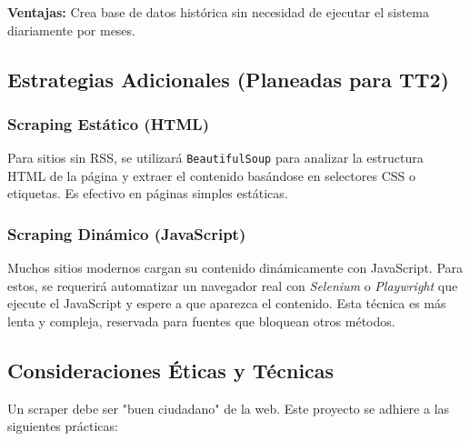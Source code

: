 \textbf{Ventajas:} Crea base de datos histórica sin necesidad de ejecutar el sistema diariamente por meses.

\subsection{Estrategias Adicionales (Planeadas para TT2)}
\label{subsec:estrategias_futuras}

\subsubsection{Scraping Estático (HTML)}
Para sitios sin RSS, se utilizará \texttt{BeautifulSoup} para analizar la estructura HTML de la página y extraer el contenido basándose en selectores CSS o etiquetas. Es efectivo en páginas simples estáticas.

\subsubsection{Scraping Dinámico (JavaScript)}
Muchos sitios modernos cargan su contenido dinámicamente con JavaScript. Para estos, se requerirá automatizar un navegador real con \textit{Selenium} o \textit{Playwright} que ejecute el JavaScript y espere a que aparezca el contenido. Esta técnica es más lenta y compleja, reservada para fuentes que bloquean otros métodos.

\subsection{Consideraciones Éticas y Técnicas}
\label{subsec:etica_scraping}

Un scraper debe ser "buen ciudadano" de la web. Este proyecto se adhiere a las siguientes prácticas:


